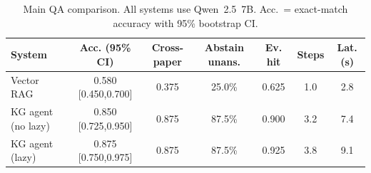 \begin{table}[t]
\centering
\caption{Main QA comparison. All systems use Qwen~2.5~7B. Acc.~= exact-match accuracy with 95\% bootstrap CI.}
\label{tab:main}
\begin{tabular}{lcccccc}
\toprule
System & Acc. (95\% CI) & Cross-paper & Abstain unans. & Ev. hit & Steps & Lat. (s) \\
\midrule
Vector RAG & 0.580 [0.450,0.700] & 0.375 & 25.0\% & 0.625 & 1.0 & 2.8 \\
KG agent (no lazy) & 0.850 [0.725,0.950] & 0.875 & 87.5\% & 0.900 & 3.2 & 7.4 \\
KG agent (lazy) & 0.875 [0.750,0.975] & 0.875 & 87.5\% & 0.925 & 3.8 & 9.1 \\
\bottomrule
\end{tabular}
\end{table}